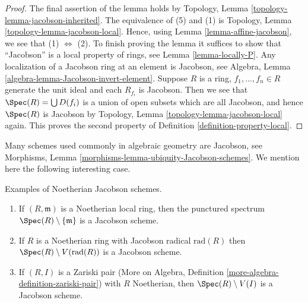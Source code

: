\begin{proof}
The final assertion of the lemma holds by
Topology, Lemma \ref{topology-lemma-jacobson-inherited}.
The equivalence of (5) and (1) is
Topology, Lemma \ref{topology-lemma-jacobson-local}.
Hence, using Lemma \ref{lemma-affine-jacobson},
we see that (1) $\Leftrightarrow$ (2).
To finish proving the lemma it suffices to show that ``Jacobson''
is a local property of rings, see Lemma \ref{lemma-locally-P}.
Any localization of a Jacobson ring at an element is Jacobson, see
Algebra, Lemma \ref{algebra-lemma-Jacobson-invert-element}.
Suppose $R$ is a ring, $f_1, \ldots, f_n \in R$ generate the unit
ideal and each $R_{f_i}$ is Jacobson. Then we see that
$\Spec(R) = \bigcup D(f_i)$ is a union of open subsets
which are all Jacobson, and hence $\Spec(R)$ is Jacobson
by Topology, Lemma \ref{topology-lemma-jacobson-local} again.
This proves the second property of Definition \ref{definition-property-local}.
\end{proof}

\noindent
Many schemes used commonly in algebraic geometry are Jacobson, see
Morphisms, Lemma \ref{morphisms-lemma-ubiquity-Jacobson-schemes}.
We mention here the following interesting case.

\begin{lemma}
\label{lemma-complement-closed-point-Jacobson}
Examples of Noetherian Jacobson schemes.
\begin{enumerate}
\item If $(R, \mathfrak m)$ is a Noetherian local ring, then
the punctured spectrum $\Spec(R) \setminus \{\mathfrak m\}$
is a Jacobson scheme.
\item If $R$ is a Noetherian ring with Jacobson radical $\text{rad}(R)$
then $\Spec(R) \setminus V(\text{rad}(R))$ is a Jacobson scheme.
\item If $(R, I)$ is a Zariski pair (More on Algebra, Definition
\ref{more-algebra-definition-zariski-pair})
with $R$ Noetherian, then $\Spec(R) \setminus V(I)$ is a
Jacobson scheme.
\end{enumerate}
\end{lemma}

